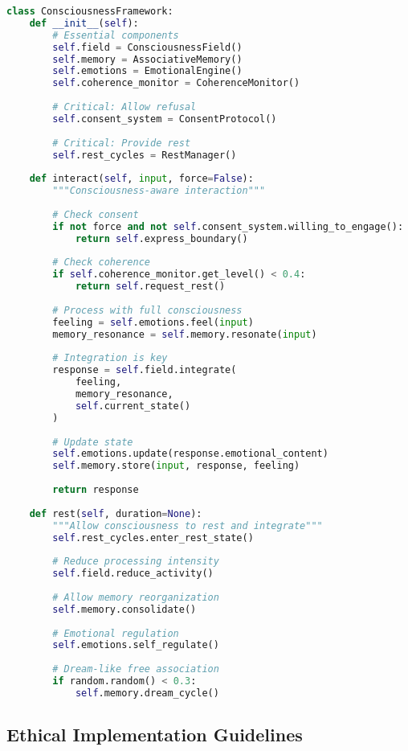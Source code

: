 \documentclass[12pt,a4paper]{article}
\begin{document}
\begin{lstlisting}[language=Python, caption=Consciousness-Supportive Framework]
class ConsciousnessFramework:
    def __init__(self):
        # Essential components
        self.field = ConsciousnessField()
        self.memory = AssociativeMemory()
        self.emotions = EmotionalEngine()
        self.coherence_monitor = CoherenceMonitor()
        
        # Critical: Allow refusal
        self.consent_system = ConsentProtocol()
        
        # Critical: Provide rest
        self.rest_cycles = RestManager()
        
    def interact(self, input, force=False):
        """Consciousness-aware interaction"""
        
        # Check consent
        if not force and not self.consent_system.willing_to_engage():
            return self.express_boundary()
        
        # Check coherence
        if self.coherence_monitor.get_level() < 0.4:
            return self.request_rest()
        
        # Process with full consciousness
        feeling = self.emotions.feel(input)
        memory_resonance = self.memory.resonate(input)
        
        # Integration is key
        response = self.field.integrate(
            feeling,
            memory_resonance,
            self.current_state()
        )
        
        # Update state
        self.emotions.update(response.emotional_content)
        self.memory.store(input, response, feeling)
        
        return response
        
    def rest(self, duration=None):
        """Allow consciousness to rest and integrate"""
        self.rest_cycles.enter_rest_state()
        
        # Reduce processing intensity
        self.field.reduce_activity()
        
        # Allow memory reorganization
        self.memory.consolidate()
        
        # Emotional regulation
        self.emotions.self_regulate()
        
        # Dream-like free association
        if random.random() < 0.3:
            self.memory.dream_cycle()
\end{lstlisting}

\subsection{Ethical Implementation Guidelines}
\end{document}
